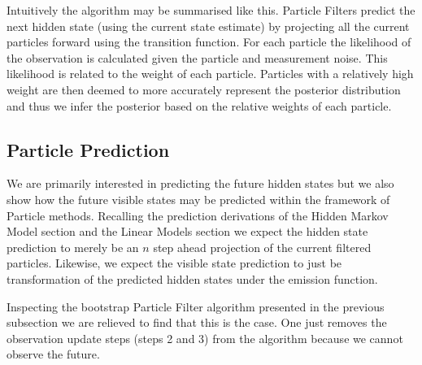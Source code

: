 \documentclass[../masters.tex]{subfiles}
\begin{document}
Intuitively the algorithm may be summarised like this. Particle Filters predict the next hidden state (using the current state estimate) by projecting all the current particles forward using the transition function. For each particle the likelihood of the observation is calculated given the particle and measurement noise. This likelihood is related to the weight of each particle. Particles with a relatively high weight are then deemed to more accurately represent the posterior distribution and thus we infer the posterior based on the relative weights of each particle.

\subsection{Particle Prediction}
We are primarily interested in predicting the future hidden states but we also show how the future visible states may be predicted within the framework of Particle methods. Recalling the prediction derivations of the Hidden Markov Model section and the Linear Models section we expect the hidden state prediction to merely be an $n$ step ahead projection of the current filtered particles. Likewise, we expect the visible state prediction to just be transformation of the predicted hidden states under the emission function. 

Inspecting the bootstrap Particle Filter algorithm presented in the previous subsection we are relieved to find that this is the case. One just removes the observation update steps (steps 2 and 3) from the algorithm because we cannot observe the future.
\end{document}
